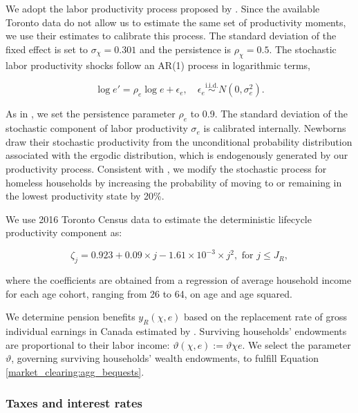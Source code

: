 \documentclass[parskip=full]{article}
\begin{document}
We adopt the labor productivity process proposed by \citet{gkkoc}. Since the available Toronto data do not allow us to estimate the same set of productivity moments, we use their estimates to calibrate this process. The standard deviation of the fixed effect is set to $\sigma_{\chi}=0.301$ and the persistence is $\rho_{\chi}=0.5$. The stochastic labor productivity shocks follow an AR(1) process in logarithmic terms,

\begin{equation*}
  \log e' = \rho_{e} \log e + \epsilon_{e},\quad \epsilon_{e}\overset{\mathrm{i.i.d.}} \sim N(0,\sigma^2_{e}).
\end{equation*}

\noindent As in \citet{gkkoc}, we set the persistence parameter $\rho_{e}$ to 0.9. The standard deviation of the stochastic component of labor productivity $\sigma_{e}$ is calibrated internally. Newborns draw their stochastic productivity from the unconditional probability distribution associated with the ergodic distribution, which is endogenously generated by our productivity process. Consistent with \citet{az-2024}, we modify the stochastic process for homeless households by increasing the probability of moving to or remaining in the lowest productivity state by 20\%.  

We use 2016 Toronto Census data to estimate the deterministic lifecycle productivity component as:

\begin{equation*}
\zeta_j = 0.923+0.09\times j-1.61\times 10^{-3}\times j^{2}, \mbox{ for } j\leq J_{R},
\end{equation*}

\noindent where the coefficients are obtained from a regression of average household income for each age cohort, ranging from 26 to 64, on age and age squared. 

We determine pension benefits ${y_{R}(\chi,e)}$ based on the replacement rate of gross individual earnings in Canada estimated by \citet{OECD-pension}. Surviving households' endowments are proportional to their labor income: $\vartheta(\chi,e):=\vartheta \chi e$. We select the parameter $\vartheta$, governing surviving households' wealth endowments, to fulfill Equation \eqref{market_clearing:agg_bequests}.

\subsubsection{Taxes and interest rates}
\end{document}
